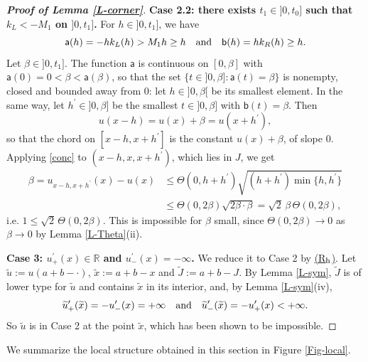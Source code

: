 \documentclass[reqno,12pt]{amsart}
\numberwithin{equation}{section}
\def\RR{{\mathds R}}
\newcommand{\Rh}{\hyperref[HypS2]{{\sf (R$_{\rm h}$)}}}
\theoremstyle{remark}
\begin{document}
\begin{proof}[\bf Proof of Lemma \ref{L-corner}]
{\bf Case 2.2: there exists \boldmath$t_1\in]0,t_0]$ such that $k_L<-M_1$ on $]0,t_1]$\unboldmath.} For $h\in]0,t_1]$, we have
\begin{equation*}
\mathsf{a}(h)=-hk_L(h)>M_1h\geq h\quad\hbox{and}\quad\mathsf{b}(h)=hk_R(h)\geq h.
\end{equation*}
Let $\beta\in]0,t_1]$. The function $\mathsf a$ is continuous on $[0,\beta]$ with $\mathsf a(0)=0<\beta<\mathsf a(\beta)$, so that the set $\{t\in]0,\beta]:\mathsf a(t)=\beta\}$ is nonempty, closed and bounded away from $0$: let $h\in]0,\beta[$ be its smallest element. In the same way, let $h^\prime\in]0,\beta]$ be the smallest $t\in]0,\beta]$ with $\mathsf b(t)=\beta$. Then
\begin{equation*}
u(x-h)=u(x)+\beta=u(x+h^\prime),
\end{equation*}
so that the chord on $[x-h,x+h^\prime]$ is the constant $u(x)+\beta$, of slope $0$. Applying \eqref{conc} to $(x-h,x,x+h^\prime)$, which lies in $J$, we get
\begin{align*}
\beta=u_{x-h,x+h^\prime}(x)-u(x)&\leq\Theta(0,h+h^\prime)\sqrt{(h+h^\prime)\min\{h,h^\prime\}}\\
&\leq\Theta(0,2\beta)\sqrt{2\beta\cdot\beta}=\sqrt2\,\beta\,\Theta(0,2\beta),
\end{align*}
i.e. $1\leq\sqrt2\,\Theta(0,2\beta)$. This is impossible for $\beta$ small, since $\Theta(0,2\beta)\to0$ as $\beta\to0$ by Lemma \ref{L-Theta}(ii).

\medskip

{\bf Case 3: \boldmath$u^\prime_+(x)\in\RR$ and $u^\prime_-(x)=-\infty$\unboldmath.} We reduce it to Case 2 by \Rh{}. Let $\widetilde u:=u(a+b-\cdot)$, $\widetilde x:=a+b-x$ and $\widetilde J:=a+b-J$. By Lemma \ref{L-sym}, $\widetilde J$ is of lower type for $\widetilde u$ and contains $\widetilde x$ in its interior, and, by Lemma \ref{L-sym}(iv),
\begin{equation*}
\widetilde u^\prime_+(\widetilde x)=-u^\prime_-(x)=+\infty\quad\hbox{and}\quad\widetilde u^\prime_-(\widetilde x)=-u^\prime_+(x)<+\infty.
\end{equation*}
So $\widetilde u$ is in Case 2 at the point $\widetilde x$, which has been shown to be impossible.
\end{proof}



We summarize the local structure obtained in this section in Figure \ref{Fig-local}.
\end{document}
